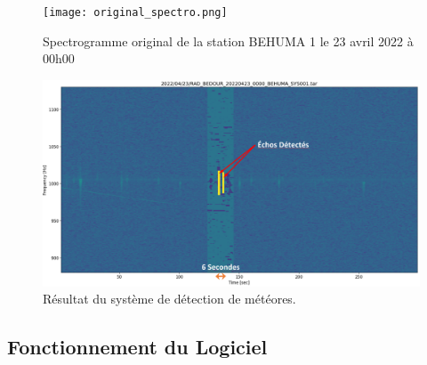 \documentclass[11pt]{article}
\begin{document}
\begin{figure}[htp]
    \begin{center}
        \texttt{[image: original\_spectro.png]}
        \caption{Spectrogramme original de la station BEHUMA 1 le 23 avril 2022 à 00h00}
        \label{fig:spectro-orig}
    \end{center}
\end{figure}

\begin{figure}[hbp]
    \begin{center}
        \includegraphics[scale=0.13]{meteor_detect_example.png}
        \caption{Résultat du système de détection de météores.}
        \label{fig:meteor-detect-ex}
    \end{center}
\end{figure}

\subsection{Fonctionnement du Logiciel}
\end{document}
